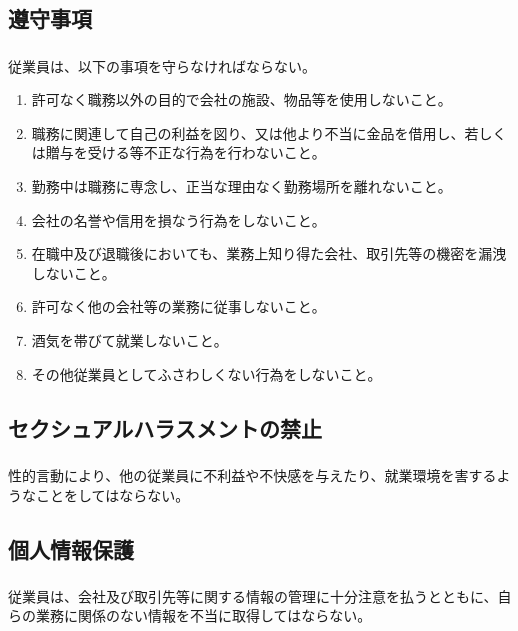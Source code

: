 \documentclass{jsarticle}
\begin{document}
\subsection{遵守事項}
\label{就規_条_遵守事項}
\subsubsection{}
\label{就規_項_遵守事項}
従業員は、以下の事項を守らなければならない。
\begin{enumerate}
  \item 許可なく職務以外の目的で会社の施設、物品等を使用しないこと。
  \item 職務に関連して自己の利益を図り、又は他より不当に金品を借用し、若しくは贈与を受ける等不正な行為を行わないこと。
  \item 勤務中は職務に専念し、正当な理由なく勤務場所を離れないこと。
  \item 会社の名誉や信用を損なう行為をしないこと。
  \item 在職中及び退職後においても、業務上知り得た会社、取引先等の機密を漏洩しないこと。
  \item 許可なく他の会社等の業務に従事しないこと。
  \item 酒気を帯びて就業しないこと。
  \item その他従業員としてふさわしくない行為をしないこと。
\end{enumerate}

\subsection{セクシュアルハラスメントの禁止}
\label{就規_条_セクシュアルハラスメントの禁止}
\subsubsection{}
\label{就規_項_セクシュアルハラスメントの禁止}
性的言動により、他の従業員に不利益や不快感を与えたり、就業環境を害するようなことをしてはならない。

\subsection{個人情報保護}
\label{就規_条_個人情報保護}
\subsubsection{}
\label{就規_項_個人情報保護}
従業員は、会社及び取引先等に関する情報の管理に十分注意を払うとともに、自らの業務に関係のない情報を不当に取得してはならない。
\end{document}
